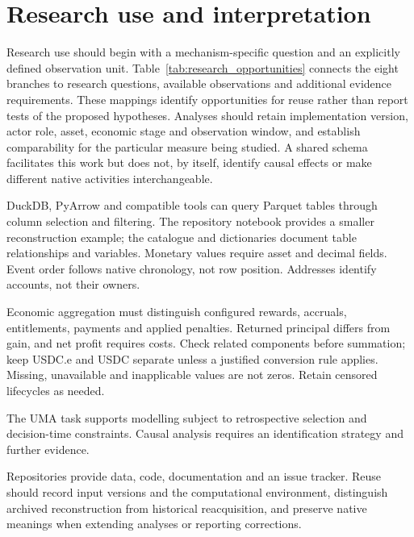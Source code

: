 \section{Research use and interpretation}

Research use should begin with a mechanism-specific question and an explicitly defined observation unit. Table~\ref{tab:research_opportunities} connects the eight branches to research questions, available observations and additional evidence requirements. These mappings identify opportunities for reuse rather than report tests of the proposed hypotheses. Analyses should retain implementation version, actor role, asset, economic stage and observation window, and establish comparability for the particular measure being studied. A shared schema facilitates this work but does not, by itself, identify causal effects or make different native activities interchangeable.



DuckDB, PyArrow and compatible tools can query Parquet tables through column selection and filtering. The repository notebook provides a smaller reconstruction example; the catalogue and dictionaries document table relationships and variables. Monetary values require asset and decimal fields. Event order follows native chronology, not row position. Addresses identify accounts, not their owners.

Economic aggregation must distinguish configured rewards, accruals, entitlements, payments and applied penalties. Returned principal differs from gain, and net profit requires costs. Check related components before summation; keep USDC.e and USDC separate unless a justified conversion rule applies. Missing, unavailable and inapplicable values are not zeros. Retain censored lifecycles as needed.

The UMA task supports modelling subject to retrospective selection and decision-time constraints. Causal analysis requires an identification strategy and further evidence.

Repositories provide data, code, documentation and an issue tracker. Reuse should record input versions and the computational environment, distinguish archived reconstruction from historical reacquisition, and preserve native meanings when extending analyses or reporting corrections.
